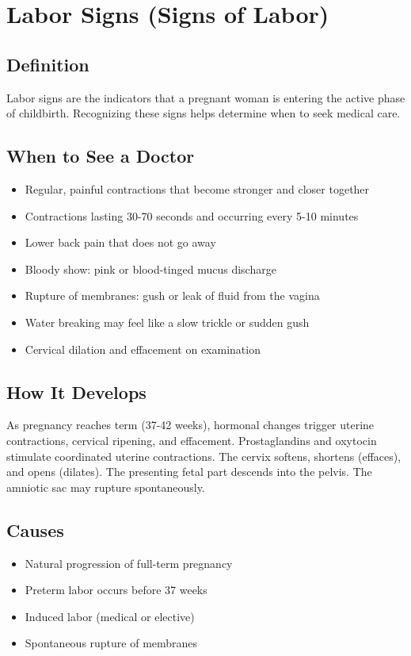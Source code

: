 \chapter{Labor Signs (Signs of Labor)}

\section*{Definition}
Labor signs are the indicators that a pregnant woman is entering the active phase of childbirth. Recognizing these signs helps determine when to seek medical care.

\section*{When to See a Doctor}
\begin{itemize}
\item Regular, painful contractions that become stronger and closer together
\item Contractions lasting 30-70 seconds and occurring every 5-10 minutes
\item Lower back pain that does not go away
\item Bloody show: pink or blood-tinged mucus discharge
\item Rupture of membranes: gush or leak of fluid from the vagina
\item Water breaking may feel like a slow trickle or sudden gush
\item Cervical dilation and effacement on examination
\end{itemize}

\section*{How It Develops}
As pregnancy reaches term (37-42 weeks), hormonal changes trigger uterine contractions, cervical ripening, and effacement. Prostaglandins and oxytocin stimulate coordinated uterine contractions. The cervix softens, shortens (effaces), and opens (dilates). The presenting fetal part descends into the pelvis. The amniotic sac may rupture spontaneously.

\section*{Causes}
\begin{itemize}
\item Natural progression of full-term pregnancy
\item Preterm labor occurs before 37 weeks
\item Induced labor (medical or elective)
\item Spontaneous rupture of membranes
\end{itemize}

